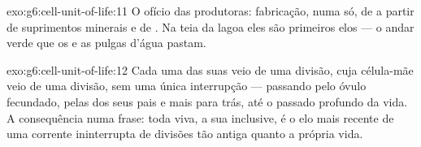 \begin{solution}{exo:g6:cell-unit-of-life:11}
O ofício das produtoras: fabricação, numa  só, de  a partir de suprimentos minerais e de . Na teia da lagoa
eles são primeiros elos --- o andar verde que os  e as pulgas
d'água pastam.
\end{solution}

\begin{solution}{exo:g6:cell-unit-of-life:12}
Cada uma das suas  veio de uma divisão, cuja célula-mãe veio de
uma divisão, sem uma única interrupção --- passando pelo óvulo
fecundado, pelas  dos seus pais e mais para trás, até o passado
profundo da vida. A consequência numa frase: toda  viva, a sua
inclusive, é o elo mais recente de uma corrente ininterrupta de
divisões tão antiga quanto a própria vida.
\end{solution}

